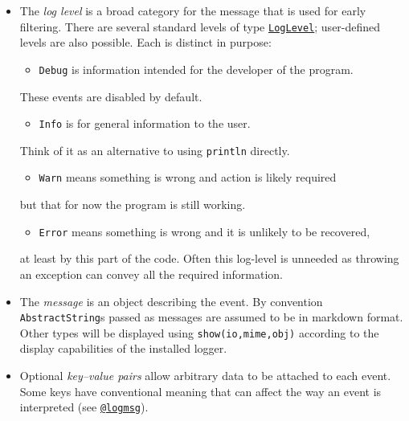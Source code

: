 \begin{itemize}
\item The \emph{log level} is a broad category for the message that is used for early filtering. There are several standard levels of type \hyperlink{10879938884267981707}{\texttt{LogLevel}}; user-defined levels are also possible. Each is distinct in purpose:

\begin{itemize}
\item \texttt{Debug} is information intended for the developer of the program.

\end{itemize}
These events are disabled by default.

\begin{itemize}
\item \texttt{Info} is for general information to the user.

\end{itemize}
Think of it as an alternative to using \texttt{println} directly.

\begin{itemize}
\item \texttt{Warn} means something is wrong and action is likely required

\end{itemize}
but that for now the program is still working.

\begin{itemize}
\item \texttt{Error} means something is wrong and it is unlikely to be recovered,

\end{itemize}
at least by this part of the code. Often this log-level is unneeded as throwing an exception can convey all the required information.


\item The \emph{message}  is an object describing the event. By convention \texttt{AbstractString}s passed as messages are assumed to be in markdown format. Other types will be displayed using \texttt{show(io,mime,obj)} according to the display capabilities of the installed logger.


\item Optional \emph{key–value pairs} allow arbitrary data to be attached to each event. Some keys have conventional meaning that can affect the way an event is interpreted (see \hyperlink{2787319849348710857}{\texttt{@logmsg}}).

\end{itemize}


